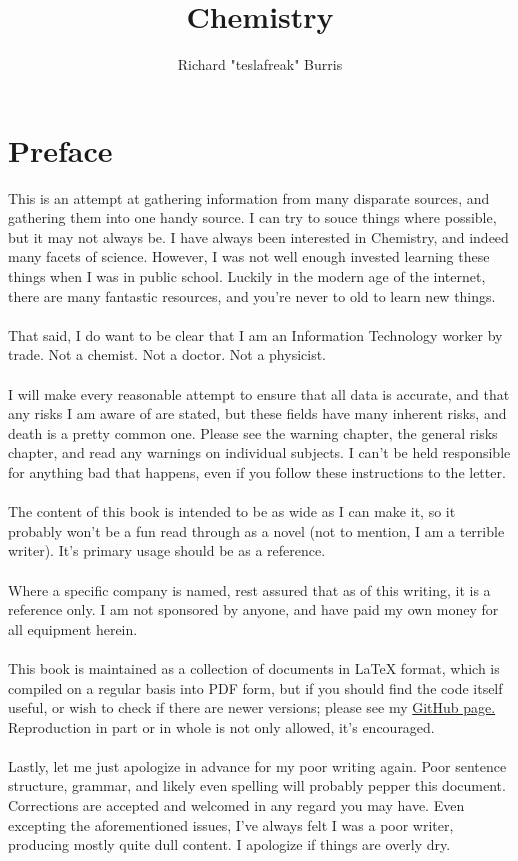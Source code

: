 \documentclass{book}
\author{Richard "teslafreak" Burris}
\title{Chemistry}
\begin{document}
\maketitle
\newpage
\tableofcontents
\newpage

\chapter{Preface}
This is an attempt at gathering information from many disparate sources, and gathering them into one handy source.  I can try to souce things where possible, but it may not always be.  I have always been interested in Chemistry, and indeed many facets of science.  However, I was not well enough invested learning these things when I was in public school.  Luckily in the modern age of the internet, there are many fantastic resources, and you're never to old to learn new things.\\
\\
That said, I do want to be clear that I am an Information Technology worker by trade.  Not a chemist.  Not a doctor.  Not a physicist.\\
\\
I will make every reasonable attempt to ensure that all data is accurate, and that any risks I am aware of are stated, but these fields have many inherent risks, and death is a pretty common one.  Please see the warning chapter, the general risks chapter, and read any warnings on individual subjects.  I can't be held responsible for anything bad that happens, even if you follow these instructions to the letter.\\
\\
The content of this book is intended to be as wide as I can make it, so it probably won't be a fun read through as a novel (not to mention, I am a terrible writer).  It's primary usage should be as a reference.\\
\\
Where a specific company is named, rest assured that as of this writing, it is a reference only.  I am not sponsored by anyone, and have paid my own money for all equipment herein.\\
\\
This book is maintained as a collection of documents in LaTeX format, which is compiled on a regular basis into PDF form, but if you should find the code itself useful, or wish to check if there are newer versions; please see my \href{https://github.com/gamory/chemistry}{GitHub page.}  Reproduction in part or in whole is not only allowed, it's encouraged.\\
\\
Lastly, let me just apologize in advance for my poor writing again.  Poor sentence structure, grammar, and likely even spelling will probably pepper this document.  Corrections are accepted and welcomed in any regard you may have.  Even excepting the aforementioned issues, I've always felt I was a poor writer, producing mostly quite dull content.  I apologize if things are overly dry.  
\end{document}
